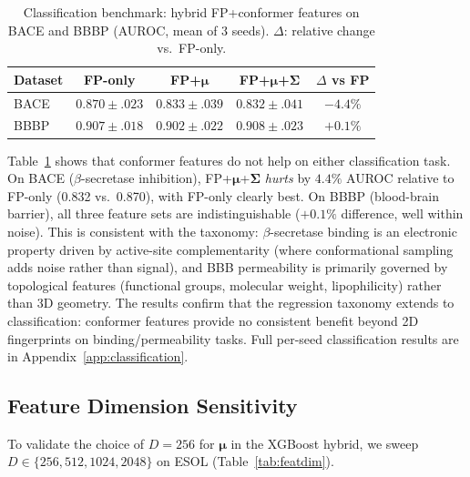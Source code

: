 \documentclass[sigconf]{acmart}
\newcommand{\rev}[1]{#1}
\begin{document}
\begin{table}[!htb]
\caption{\rev{Classification benchmark: hybrid FP+conformer features on BACE and BBBP (AUROC, mean of 3 seeds). $\Delta$: relative change vs.\ FP-only.}}
\label{tab:classification}
\centering
\small
\begin{tabular}{@{}lcccc@{}}
\toprule
Dataset & FP-only & FP+$\boldsymbol{\mu}$ & FP+$\boldsymbol{\mu}$+$\boldsymbol{\Sigma}$ & $\Delta$ vs FP \\
\midrule
BACE & $0.870{\pm}.023$ & $0.833{\pm}.039$ & $0.832{\pm}.041$ & $-4.4\%$ \\
BBBP & $0.907{\pm}.018$ & $0.902{\pm}.022$ & $0.908{\pm}.023$ & $+0.1\%$ \\
\bottomrule
\end{tabular}
\end{table}

\rev{Table~\ref{tab:classification} shows that conformer features do not help on either classification task. On BACE ($\beta$-secretase inhibition), FP+$\boldsymbol{\mu}$+$\boldsymbol{\Sigma}$ \emph{hurts} by $4.4\%$ AUROC relative to FP-only (0.832 vs.\ 0.870), with FP-only clearly best. On BBBP (blood-brain barrier), all three feature sets are indistinguishable ($+0.1\%$ difference, well within noise). This is consistent with the taxonomy: $\beta$-secretase binding is an electronic property driven by active-site complementarity (where conformational sampling adds noise rather than signal), and BBB permeability is primarily governed by topological features (functional groups, molecular weight, lipophilicity) rather than 3D geometry. The results confirm that the regression taxonomy extends to classification: conformer features provide no consistent benefit beyond 2D fingerprints on binding/permeability tasks. Full per-seed classification results are in Appendix~\ref{app:classification}.}

\FloatBarrier
\subsection{\rev{Feature Dimension Sensitivity}}
\label{sec:featdim}

\rev{To validate the choice of $D = 256$ for $\boldsymbol{\mu}$ in the XGBoost hybrid, we sweep $D \in \{256, 512, 1024, 2048\}$ on ESOL (Table~\ref{tab:featdim}).}
\end{document}
